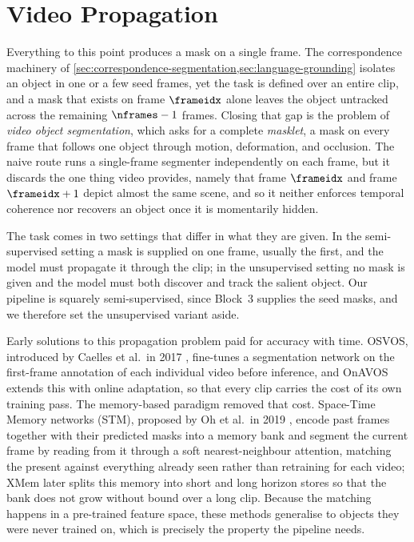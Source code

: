 \section{Video Propagation}
\label{sec:addition-of-time}

Everything to this point produces a mask on a single frame. The correspondence
machinery of \cref{sec:correspondence-segmentation,sec:language-grounding} isolates an
object in one or a few seed frames, yet the task is defined over an entire clip, and a
mask that exists on frame $\frameidx$ alone leaves the object untracked across the
remaining $\nframes - 1$ frames. Closing that gap is the problem of \textit{video object
segmentation}, which asks for a complete \textit{masklet}, a mask on every frame that
follows one object through motion, deformation, and occlusion. The naive route runs a
single-frame segmenter independently on each frame, but it discards the one thing video
provides, namely that frame $\frameidx$ and frame $\frameidx + 1$ depict almost the same
scene, and so it neither enforces temporal coherence nor recovers an object once it is
momentarily hidden.

The task comes in two settings that differ in what they are given. In the
semi-supervised setting a mask is supplied on one frame, usually the first, and the model
must propagate it through the clip; in the unsupervised setting no mask is given and the
model must both discover and track the salient object. Our pipeline is squarely
semi-supervised, since Block~3 supplies the seed masks, and we therefore set the
unsupervised variant aside.

Early solutions to this propagation problem paid for accuracy with time. OSVOS,
introduced by Caelles et al.\ in 2017 \cite{caelles2017osvos}, fine-tunes a segmentation
network on the first-frame annotation of each individual video before inference, and
OnAVOS extends this with online adaptation, so that every clip carries the cost of its
own training pass. The memory-based paradigm removed that cost. Space-Time Memory
networks (STM), proposed by Oh et al.\ in 2019 \cite{oh2019stm}, encode past frames
together with their predicted masks into a memory bank and segment the current frame by
reading from it through a soft nearest-neighbour attention, matching the present against
everything already seen rather than retraining for each video; XMem \cite{cheng2022xmem}
later splits this memory into short and long horizon stores so that the bank does not
grow without bound over a long clip. Because the matching happens in a pre-trained
feature space, these methods generalise to objects they were never trained on, which is
precisely the property the pipeline needs.

